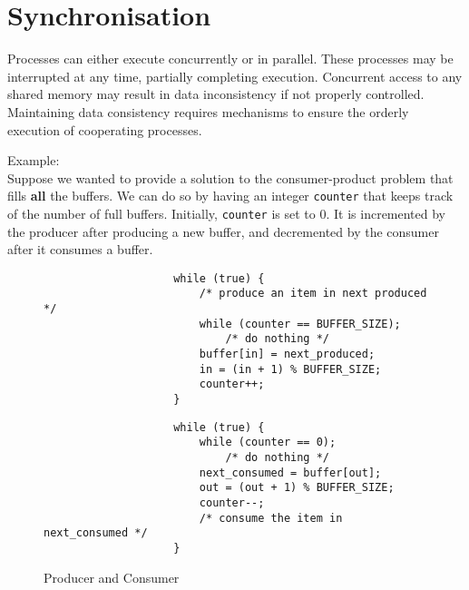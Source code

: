 \documentclass[oneside]{book}
\begin{document}
    \chapter{Synchronisation}
        Processes can either execute concurrently or in parallel. These processes may be 
        interrupted at any time, partially completing execution.
        Concurrent access to any shared memory may result in data inconsistency if not properly
        controlled.\\
        Maintaining data consistency requires mechanisms to ensure the orderly execution of 
        cooperating processes.

        \hangindent=1cm Example: \\Suppose we wanted to provide a solution to the consumer-product problem that
        fills \textbf{all} the buffers. We can do so by having an integer \texttt{counter} that keeps
        track of the number of full buffers. Initially, \texttt{counter} is set to 0. It is incremented
        by the producer after producing a new buffer, and decremented by the consumer after it consumes
        a buffer.
        \begin{figure}[H]
            \centering
            \begin{minipage}{0.49\textwidth}
                \begin{verbatim}
                    while (true) {
                        /* produce an item in next produced */
                        while (counter == BUFFER_SIZE);
                            /* do nothing */
                        buffer[in] = next_produced;
                        in = (in + 1) % BUFFER_SIZE;
                        counter++;
                    }
                \end{verbatim}
            \end{minipage}
            \begin{minipage}{0.49\textwidth}
                \begin{verbatim}
                    while (true) {
                        while (counter == 0);
                            /* do nothing */
                        next_consumed = buffer[out];
                        out = (out + 1) % BUFFER_SIZE;
                        counter--;
                        /* consume the item in next_consumed */
                    }
                \end{verbatim}
            \end{minipage}
            \caption{Producer and Consumer}
        \end{figure}
\end{document}
